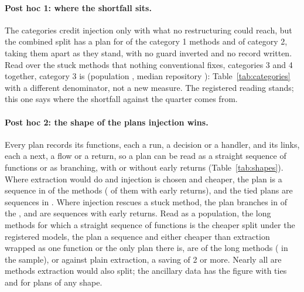 \documentclass[11pt,a4paper]{article}
\newcommand{\fitwidth}[1]{\resizebox{\ifdim\width>\textwidth\textwidth\else\width\fi}{!}{#1}}
\begin{document}
\paragraph{Post hoc 1: where the shortfall sits.} The categories credit
injection only with what no restructuring could reach, but the combined
split has a plan for \planInCatOneShare{} of the category 1 methods and
\planInCatTwoShare{} of category 2, taking them apart as they stand, with no
guard inverted and no record written. Read over the \nNotConventional{}
stuck methods that nothing conventional fixes, categories 3 and 4 together,
category 3 is \rescueOfNotConventional{} (population
\rescueOfNotConventionalCi{}, median repository
\rescueOfNotConventionalMedian{}): Table~\ref{tab:categories} with a
different denominator, not a new measure. The registered reading stands;
this one says where the shortfall against the quarter comes from.

\paragraph{Post hoc 2: the shape of the plans injection wins.} Every plan
records its functions, each a run, a decision or a handler, and its links,
each a next, a flow or a return, so a plan can be read as a straight sequence
of functions or as branching, with or without early returns
(Table~\ref{tab:shapes}). Where extraction would do and injection is chosen
and cheaper, the plan is a sequence in \shapeImprovedAnySequence{} of the
\shapeNImproved{} methods (\shapeImprovedSequenceReturns{} of them with early
returns), and the tied plans are sequences in \shapeTiedAnySequence{}. Where
injection rescues a stuck method, the plan branches in
\shapeRescuedAnyBranching{} of the \shapeNRescued{}, and
\shapeRescuedSequenceReturns{} are sequences with early returns.
Read as a population, the long methods for which a straight sequence of
functions is the cheaper split under the registered models, the plan a
sequence and either cheaper than extraction wrapped as one function or the
only plan there is, are \ciSeqWay{} of the long methods (\nSeqWay{} in the
sample), or \ciSeqWayStrict{} against plain extraction, a saving of 2 or
more. Nearly all are methods extraction would also split; the ancillary data
has the figure with ties and for plans of any shape.

\begin{table}[t]
\centering\small
\caption{Post hoc: the shape of the combined split's plan where it uses injection, read from the plan's functions and links. A sequence has no decision function; early returns are return links from a function other than the last.}
\label{tab:shapes}
\fitwidth{}
\end{table}
\end{document}

